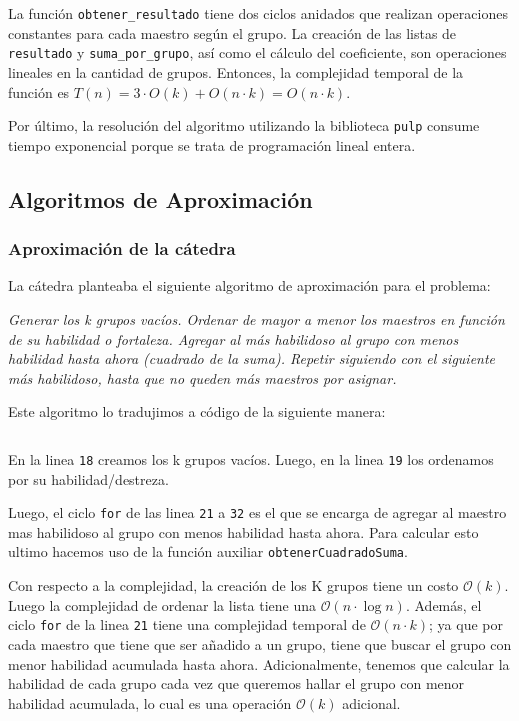 \documentclass{article}
\begin{document}
La función \texttt{obtener\_resultado} tiene dos ciclos anidados que realizan operaciones constantes para cada maestro según el grupo. La creación de las listas de \texttt{resultado} y \texttt{suma\_por\_grupo}, así como el cálculo del coeficiente, son operaciones lineales en la cantidad de grupos. Entonces, la complejidad temporal de la función es $T(n) = 3 \cdot O(k) + O(n \cdot k) = O(n \cdot k)$.

Por último, la resolución del algoritmo utilizando la biblioteca \texttt{pulp} consume tiempo exponencial porque se trata de programación lineal entera.

\subsection{Algoritmos de Aproximación}
\subsubsection{Aproximación de la cátedra}
\label{sec:algoAproxCatedra}

La cátedra planteaba el siguiente algoritmo de aproximación para el problema:

\textit{Generar los k grupos vacíos. Ordenar de mayor a menor los maestros en función de su habilidad o fortaleza. Agregar al más habilidoso al grupo con menos habilidad hasta ahora (cuadrado de la suma). Repetir siguiendo con el siguiente más habilidoso, hasta que no queden más maestros por asignar.}

Este algoritmo lo tradujimos a código de la siguiente manera:

\inputminted[linenos, lastline=45]{python}{codigo/aproximacion_catedra.py}

En la linea \texttt{18} creamos los k grupos vacíos. Luego, en la linea \texttt{19} los ordenamos por su habilidad/destreza.

Luego, el ciclo \texttt{for} de las linea \texttt{21} a \texttt{32} es el que se encarga de agregar al maestro mas habilidoso al grupo con menos habilidad hasta ahora. Para calcular esto ultimo hacemos uso de la función auxiliar \texttt{obtenerCuadradoSuma}.

Con respecto a la complejidad, la creación de los K grupos tiene un costo $\mathcal{O}(k)$. Luego la complejidad de ordenar la lista tiene una  $\mathcal{O}(n \cdot \log n)$.
Además, el ciclo \texttt{for} de la linea \texttt{21} tiene  una complejidad temporal de $\mathcal{O}(n \cdot k)$; ya que por cada maestro que tiene que ser añadido a un grupo, tiene que buscar el grupo con menor habilidad acumulada hasta ahora. Adicionalmente, tenemos que calcular la habilidad de cada grupo cada vez que queremos hallar el grupo con menor habilidad acumulada, lo cual es una operación $\mathcal{O}(k)$ adicional. 
\end{document}
